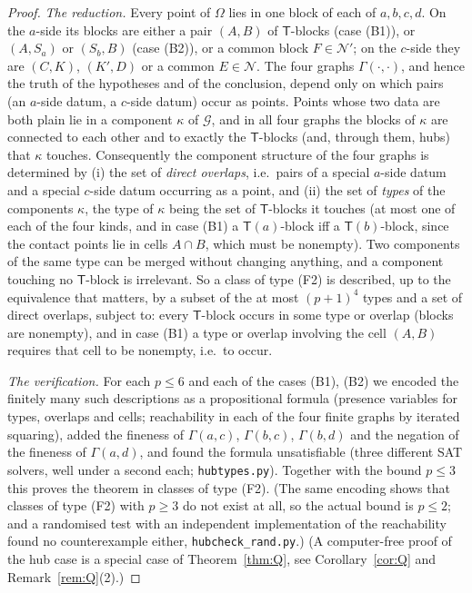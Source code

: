\documentclass[11pt]{amsart}
\theoremstyle{definition}
\newcommand{\T}{\mathsf{T}}
\begin{document}
\begin{proof}
\smallskip
\emph{The reduction.} Every point of $\Omega$ lies in one block of each of $a,b,c,d$. On the $a$-side its blocks are either a pair $(A,B)$ of $\T$-blocks (case (B1)), or $(A,S_a)$ or $(S_b,B)$ (case (B2)), or a common block $F\in\mathcal N'$; on the $c$-side they are $(C,K)$, $(K',D)$ or a common $E\in\mathcal N$. The four graphs $\Gamma(\cdot,\cdot)$, and hence the truth of the hypotheses and of the conclusion, depend only on which pairs (an $a$-side datum, a $c$-side datum) occur as points. Points whose two data are both plain lie in a component $\kappa$ of $\mathcal G$, and in all four graphs the blocks of $\kappa$ are connected to each other and to exactly the $\T$-blocks (and, through them, hubs) that $\kappa$ touches. Consequently the component structure of the four graphs is determined by (i) the set of \emph{direct overlaps}, i.e.\ pairs of a special $a$-side datum and a special $c$-side datum occurring as a point, and (ii) the set of \emph{types} of the components $\kappa$, the type of $\kappa$ being the set of $\T$-blocks it touches (at most one of each of the four kinds, and in case (B1) a $\T(a)$-block iff a $\T(b)$-block, since the contact points lie in cells $A\cap B$, which must be nonempty). Two components of the same type can be merged without changing anything, and a component touching no $\T$-block is irrelevant. So a class of type (F2) is described, up to the equivalence that matters, by a subset of the at most $(p+1)^4$ types and a set of direct overlaps, subject to: every $\T$-block occurs in some type or overlap (blocks are nonempty), and in case (B1) a type or overlap involving the cell $(A,B)$ requires that cell to be nonempty, i.e.\ to occur.

\smallskip
\emph{The verification.} For each $p\le6$ and each of the cases (B1), (B2) we encoded the finitely many such descriptions as a propositional formula (presence variables for types, overlaps and cells; reachability in each of the four finite graphs by iterated squaring), added the fineness of $\Gamma(a,c)$, $\Gamma(b,c)$, $\Gamma(b,d)$ and the negation of the fineness of $\Gamma(a,d)$, and found the formula unsatisfiable (three different SAT solvers, well under a second each; \texttt{hubtypes.py}). Together with the bound $p\le3$ this proves the theorem in classes of type (F2). (The same encoding shows that classes of type (F2) with $p\ge3$ do not exist at all, so the actual bound is $p\le2$; and a randomised test with an independent implementation of the reachability found no counterexample either, \texttt{hubcheck\_rand.py}.) (A computer-free proof of the hub case is a special case of Theorem~\ref{thm:Q}, see Corollary~\ref{cor:Q} and Remark~\ref{rem:Q}(2).)
\end{proof}
\end{document}

